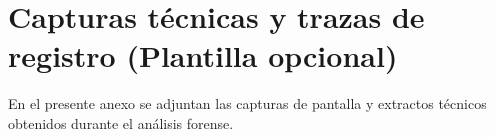 \section{Capturas técnicas y trazas de registro (Plantilla opcional)}


En el presente anexo se adjuntan las capturas de pantalla y extractos técnicos obtenidos durante el análisis forense.

